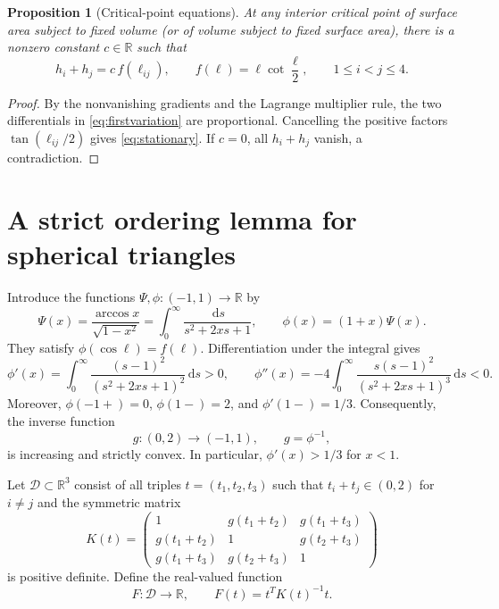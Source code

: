 \documentclass[11pt,reqno]{amsart}
\newtheorem{proposition}[theorem]{Proposition}
\theoremstyle{remark}
\newcommand{\R}{\mathbb R}
\newcommand{\dd}{\,\mathrm d}
\begin{document}
\begin{proposition}[Critical-point equations]\label{prop:stationary}
At any interior critical point of surface area subject to fixed volume (or of volume subject to fixed surface area), there is a nonzero constant $c\in\R$ such that
\begin{equation}\label{eq:stationary}
 h_i+h_j=c\,f(\ell_{ij}),\qquad
 f(\ell)=\ell\cot\frac\ell2,\qquad 1\le i<j\le4.
\end{equation}
\end{proposition}
\begin{proof}
By the nonvanishing gradients and the Lagrange multiplier rule, the two differentials in \eqref{eq:firstvariation} are proportional. Cancelling the positive factors $\tan(\ell_{ij}/2)$ gives \eqref{eq:stationary}. If $c=0$, all $h_i+h_j$ vanish, a contradiction.
\end{proof}

\section{A strict ordering lemma for spherical triangles}\label{sec:triangle}

Introduce the functions $\Psi,\phi:(-1,1)\to\R$ by
\begin{equation}\label{eq:phi}
 \Psi(x)=\frac{\arccos x}{\sqrt{1-x^2}}
 =\int_0^\infty\frac{\dd s}{s^2+2xs+1},
 \qquad \phi(x)=(1+x)\Psi(x).
\end{equation}
They satisfy $\phi(\cos\ell)=f(\ell)$. Differentiation under the integral gives
\begin{equation}\label{eq:phi-concave}
 \phi'(x)=\int_0^\infty\frac{(s-1)^2}{(s^2+2xs+1)^2}\dd s>0,
 \qquad
 \phi''(x)=-4\int_0^\infty\frac{s(s-1)^2}{(s^2+2xs+1)^3}\dd s<0.
\end{equation}
Moreover, $\phi(-1+)=0$, $\phi(1-)=2$, and $\phi'(1-)=1/3$. Consequently, the inverse function
\begin{equation}\label{eq:g}
 g:(0,2)\longrightarrow(-1,1),\qquad g=\phi^{-1},
\end{equation}
is increasing and strictly convex. In particular, $\phi'(x)>1/3$ for $x<1$.

Let $\mathcal D\subset\R^3$ consist of all triples $t=(t_1,t_2,t_3)$ such that $t_i+t_j\in(0,2)$ for $i\ne j$ and the symmetric matrix
\begin{equation}\label{eq:K}
 K(t)=\begin{pmatrix}
 1&g(t_1+t_2)&g(t_1+t_3)\\
 g(t_1+t_2)&1&g(t_2+t_3)\\
 g(t_1+t_3)&g(t_2+t_3)&1
 \end{pmatrix}
\end{equation}
is positive definite. Define the real-valued function
\begin{equation}\label{eq:F}
 F:\mathcal D\to\R,\qquad F(t)=t^TK(t)^{-1}t.
\end{equation}
\end{document}
